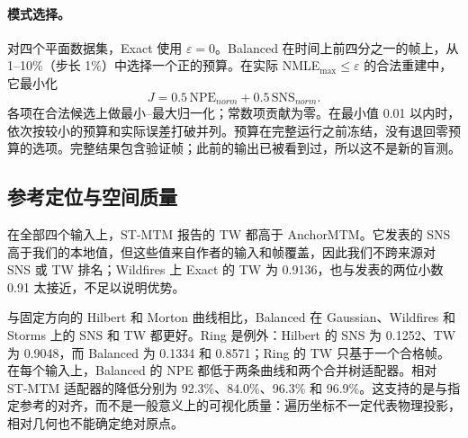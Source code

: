 \documentclass[fontset=none,zihao=5,a4paper]{ctexart}
\begin{document}
\paragraph{模式选择。}
对四个平面数据集，Exact 使用 $\varepsilon=0$。Balanced 在时间上前四分之一的帧上，从 1--10\%（步长 1\%）中选择一个正的预算。在实际 NMLE$_{\max}\le\varepsilon$ 的合法重建中，它最小化
\begin{equation}\label{eq:balanced-validation-score}
J=0.5\,\mathrm{NPE}_{norm}+0.5\,\mathrm{SNS}_{norm}.
\end{equation}
各项在合法候选上做最小–最大归一化；常数项贡献为零。在最小值 0.01 以内时，依次按较小的预算和实际误差打破并列。预算在完整运行之前冻结，没有退回零预算的选项。完整结果包含验证帧；此前的输出已被看到过，所以这不是新的盲测。

\subsection{参考定位与空间质量}
在全部四个输入上，ST-MTM 报告的 TW 都高于 AnchorMTM。它发表的 SNS 高于我们的本地值，但这些值来自作者的输入和帧覆盖，因此我们不跨来源对 SNS 或 TW 排名；Wildfires 上 Exact 的 TW 为 0.9136，也与发表的两位小数 0.91 太接近，不足以说明优势。

与固定方向的 Hilbert 和 Morton 曲线相比，Balanced 在 Gaussian、Wildfires 和 Storms 上的 SNS 和 TW 都更好。Ring 是例外：Hilbert 的 SNS 为 0.1252、TW 为 0.9048，而 Balanced 为 0.1334 和 0.8571；Ring 的 TW 只基于一个合格帧。在每个输入上，Balanced 的 NPE 都低于两条曲线和两个合并树适配器。相对 ST-MTM 适配器的降低分别为 92.3\%、84.0\%、96.3\% 和 96.9\%。这支持的是与指定参考的对齐，而不是一般意义上的可视化质量：遍历坐标不一定代表物理投影，相对几何也不能确定绝对原点。
\end{document}
